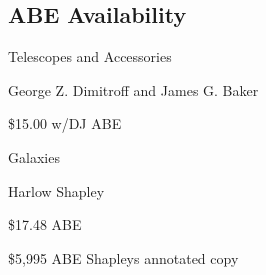 \subsection{ABE Availability}

Telescopes and Accessories

George Z. Dimitroff and James G. Baker

\$15.00 w/DJ ABE
  

Galaxies

Harlow Shapley

\$17.48 ABE

\$5,995 ABE Shapleys annotated copy
